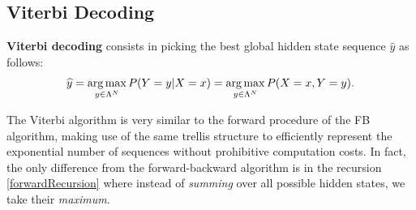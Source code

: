 %


\subsection{Viterbi Decoding}\label{viterbi}


\textbf{Viterbi decoding} consists in
picking the best global hidden state sequence 
$\widehat{y}$
as follows: 
\begin{equation}
\widehat{y} = \operatorname*{arg\,max}_{y \in \Lambda^N} P(Y=y|X=x) = \operatorname*{arg\,max}_{y \in \Lambda^N} P(X=x,Y=y).
\end{equation}

The Viterbi algorithm 
is very similar to the forward procedure of the FB algorithm,
making use of the same trellis structure to efficiently represent the exponential number of sequences without prohibitive computation costs. In fact, the only
difference from the forward-backward algorithm is in the recursion
\ref{forwardRecursion} where instead of \emph{summing} over all possible 
hidden states, we take their \emph{maximum}.

